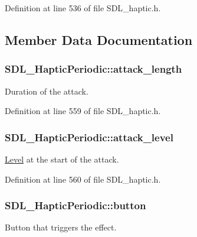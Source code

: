 Definition at line 536 of file S\-D\-L\-\_\-haptic.\-h.



\subsection{Member Data Documentation}
\hypertarget{struct_s_d_l___haptic_periodic_ab35eedce7107edc75640586159fe75bb}{
\subsubsection[{attack\-\_\-length}]{ S\-D\-L\-\_\-\-Haptic\-Periodic\-::attack\-\_\-length}}\label{struct_s_d_l___haptic_periodic_ab35eedce7107edc75640586159fe75bb}
Duration of the attack. 

Definition at line 559 of file S\-D\-L\-\_\-haptic.\-h.

\hypertarget{struct_s_d_l___haptic_periodic_a79fc2217fea6db6ab3d89ad905d52ccb}{
\subsubsection[{attack\-\_\-level}]{ S\-D\-L\-\_\-\-Haptic\-Periodic\-::attack\-\_\-level}}\label{struct_s_d_l___haptic_periodic_a79fc2217fea6db6ab3d89ad905d52ccb}
\hyperlink{class_level}{Level} at the start of the attack. 

Definition at line 560 of file S\-D\-L\-\_\-haptic.\-h.

\hypertarget{struct_s_d_l___haptic_periodic_a9e0177354f4a285b8c98e4a31cd31752}{
\subsubsection[{button}]{ S\-D\-L\-\_\-\-Haptic\-Periodic\-::button}}\label{struct_s_d_l___haptic_periodic_a9e0177354f4a285b8c98e4a31cd31752}
Button that triggers the effect. 


